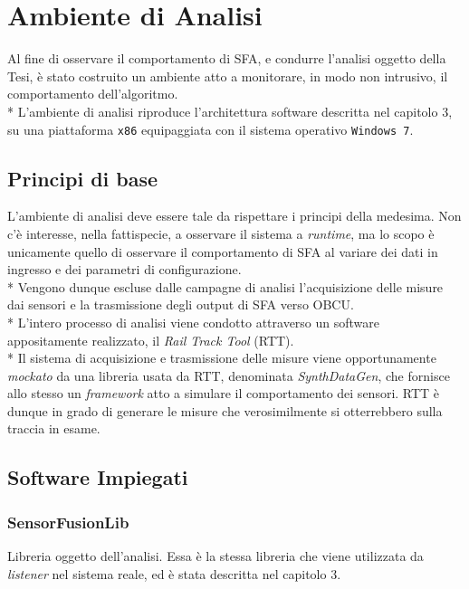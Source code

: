 \chapter{Ambiente di Analisi}
Al fine di osservare il comportamento di SFA, e condurre l'analisi oggetto della Tesi, \`e stato costruito un ambiente atto a monitorare, in modo non intrusivo, il comportamento dell'algoritmo. \cite{monitoring}\\*
L'ambiente di analisi riproduce l'architettura software descritta nel capitolo 3, su una piattaforma \texttt{x86} equipaggiata con il sistema operativo \texttt{Windows 7}. 
\section{Principi di base}
L'ambiente di analisi deve essere tale da rispettare i principi della medesima. Non c'\`e interesse, nella fattispecie, a osservare il sistema a \emph{runtime}, ma lo scopo \`e unicamente quello di osservare il comportamento di SFA al variare dei dati in ingresso e dei parametri di configurazione.\\*
Vengono dunque escluse dalle campagne di analisi l'acquisizione delle misure dai sensori e la trasmissione degli output di SFA verso OBCU.\\*
L'intero processo di analisi viene condotto attraverso un software appositamente realizzato, il \emph{Rail Track Tool} (RTT).\\*
Il sistema di acquisizione e trasmissione delle misure viene opportunamente \emph{mockato} \cite{mocking} da una libreria usata da RTT, denominata \emph{SynthDataGen}, che fornisce allo stesso un \emph{framework} atto a simulare il comportamento dei sensori. RTT \`e dunque in grado di generare le misure che verosimilmente si otterrebbero sulla traccia in esame. 
\section{Software Impiegati}
\subsection{SensorFusionLib}
Libreria oggetto dell'analisi.
Essa \`e la stessa libreria che viene utilizzata da \emph{listener} nel sistema reale, ed \`e stata descritta nel capitolo 3.
